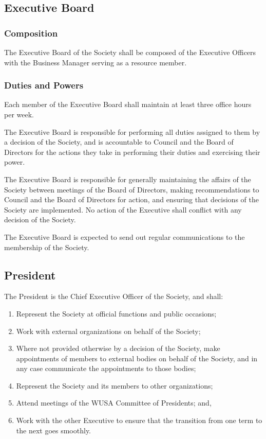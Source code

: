 \subsection{Executive Board}

\subsubsection{Composition}
The Executive Board of the Society shall be composed of the Executive Officers
with the Business Manager serving as a resource member.

\subsubsection{Duties and Powers}
Each member of the Executive Board shall maintain at least three office hours
per week.

The Executive Board is responsible for performing all duties assigned to them
by a decision of the Society, and is accountable to Council and the
Board of Directors for the actions they take in performing their duties and
exercising their power.

The Executive Board is responsible for generally maintaining the affairs of the
Society between meetings of the Board of Directors, making recommendations to
Council and the Board of Directors for action, and ensuring that
decisions of the Society are implemented.  No action of the Executive shall
conflict with any decision of the Society.

The Executive Board is expected to send out regular communications to the
membership of the Society.

\subsection{President}
The President is the Chief Executive Officer of the Society, and shall:
\begin{enumerate}
  \item Represent the Society at official functions and public occasions;
  \item Work with external organizations on behalf of the Society;
  \item Where not provided otherwise by a decision of the Society, make
    appointments of members to external bodies on behalf of the Society, and in
    any case communicate the appointments to those bodies;
  \item Represent the Society and its members to other organizations;
  \item Attend meetings of the WUSA Committee of Presidents; and,
  \item Work with the other Executive to ensure that the transition from one
    term to the next goes smoothly.
\end{enumerate}

